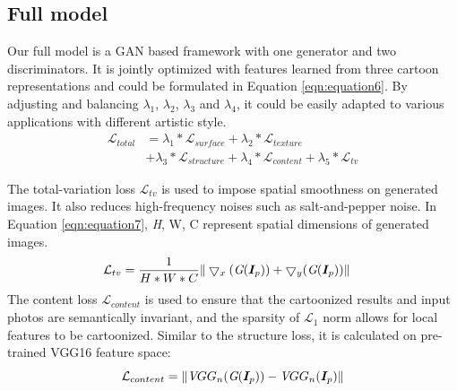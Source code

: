 \documentclass[10pt,twocolumn,letterpaper]{article}
\begin{document}
\subsection{Full model}
Our full model is a GAN based framework with one generator and two discriminators. It is jointly optimized with features learned from three cartoon representations and could be formulated in Equation \ref{eqn:equation6}. By adjusting and balancing $\lambda_1$, $\lambda_2$, $\lambda_3$ and $\lambda_4$, it could be easily adapted to various applications with different artistic style. 
\begin{equation}
\begin{aligned}
\mathcal{L}_{total} &= \lambda_1*\mathcal{L}_{surface} + \lambda_2*\mathcal{L}_{texture} \\
&+ \lambda_3*\mathcal{L}_{structure} + \lambda_4*\mathcal{L}_{content} +\lambda_5*\mathcal{L}_{tv}
\end{aligned}
\label{eqn:equation6}
\end{equation}

The total-variation loss $\mathcal{L}_{tv}$ \cite{aly2005image} is used to impose spatial smoothness on generated images. It also reduces high-frequency noises such as salt-and-pepper noise. In Equation \ref{eqn:equation7}, {\textit H, W, C} represent spatial dimensions of generated images. 
\begin{equation}
\begin{aligned}
\mathcal{L}_{tv} &= \frac{1}{H*W*C} \| \bigtriangledown_x({\textit G}(\bm{I}_p)) + \bigtriangledown_y({\textit G}(\bm{I}_p))\| 
\end{aligned}
\label{eqn:equation7}
\end{equation}
The content loss $\mathcal{L}_{content}$ is used to ensure that the cartoonized results and input photos are semantically invariant, and the sparsity of $\mathcal{L}_1$ norm allows for local features to be cartoonized. Similar to the structure loss, it is calculated on pre-trained VGG16 feature space:
\begin{equation}
\mathcal{L}_{content} = \| {\textit VGG_n}({\textit G}(\bm{I}_p)) - {\textit VGG_n}(\bm{I}_p)\|
\label{eqn:equation8}
\end{equation}
\end{document}
